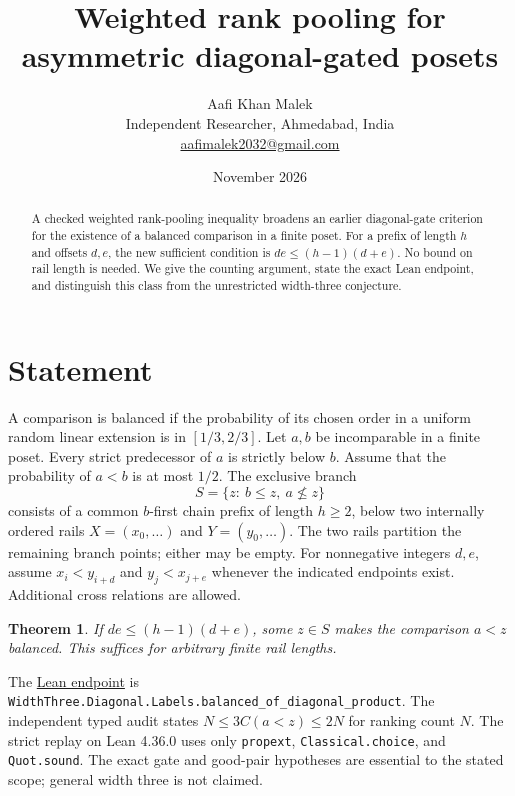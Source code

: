 \documentclass[11pt,letterpaper]{article}
\title{Weighted rank pooling for asymmetric diagonal-gated posets}
\author{Aafi Khan Malek\\\small Independent Researcher, Ahmedabad, India\\
\small\href{mailto:aafimalek2032@gmail.com}{aafimalek2032@gmail.com}}
\date{November 2026}
\newtheorem{theorem}{Theorem}
\begin{document}
\maketitle
\begin{abstract}
A checked weighted rank-pooling inequality broadens an earlier
diagonal-gate criterion for the existence of a balanced comparison
in a finite poset. For a prefix of length \(h\) and offsets \(d,e\),
the new sufficient condition is \(de\le(h-1)(d+e)\). No bound on
rail length is needed. We give the counting argument, state the
exact Lean endpoint, and distinguish this class from the unrestricted
width-three conjecture.
\end{abstract}

\section*{Statement}
A comparison is balanced if the probability of its chosen order in a
uniform random linear extension is in \([1/3,2/3]\). Let \(a,b\) be
incomparable in a finite poset. Every strict predecessor of \(a\)
is strictly below \(b\). Assume that the probability of \(a<b\)
is at most \(1/2\). The exclusive branch
\[
 S=\{z:\ b\le z,\ a\not\le z\}
\]
consists of a common \(b\)-first chain prefix of length \(h\ge2\),
below two internally ordered rails \(X=(x_0,\ldots)\) and
\(Y=(y_0,\ldots)\). The two rails partition the remaining branch
points; either may be empty. For nonnegative integers \(d,e\),
assume \(x_i<y_{i+d}\) and \(y_j<x_{j+e}\) whenever the indicated
endpoints exist. Additional cross relations are allowed.

\begin{theorem}
If \(de\le(h-1)(d+e)\), some \(z\in S\) makes the comparison
\(a<z\) balanced. This suffices for arbitrary finite rail lengths.
\end{theorem}
The \href{https://github.com/Aafimalek/novel-discoveries/tree/b6e15ab63380419495d7fe9813427c704283e869/width-three-posets/verification/diagonal-gated-two-arm-branches/lean-asymmetric-weighted-class}{Lean endpoint}
is \texttt{WidthThree.Diagonal.Labels.balanced\_of\_diagonal\_product}.
The independent typed audit states
\(N\le3C(a<z)\le2N\) for ranking count \(N\).
The strict replay on Lean 4.36.0 uses only
\texttt{propext}, \texttt{Classical.choice}, and \texttt{Quot.sound}.
The exact gate and good-pair hypotheses are essential to the stated
scope; general width three is not claimed.
\end{document}
